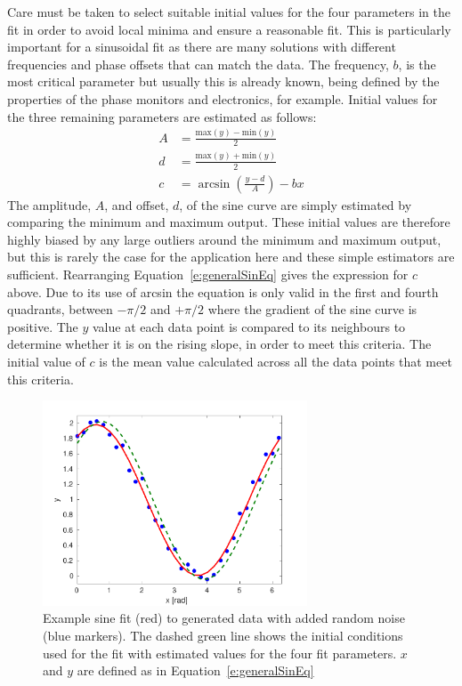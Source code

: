 Care must be taken to select suitable initial values for the four parameters in the fit in order to avoid local minima and ensure a reasonable fit. This is particularly important for a sinusoidal fit as there are many solutions with different frequencies and phase offsets that can match the data. The frequency, \(b\), is the most critical parameter but usually this is already known, being defined by the properties of the phase monitors and electronics, for example. Initial values for the three remaining parameters are estimated as follows:
\begin{align}
A &= \frac{\mathrm{max}(y)-\mathrm{min}(y)}{2} \\
d &= \frac{\mathrm{max}(y)+\mathrm{min}(y)}{2} \\
c &= \arcsin\left(\frac{y-d}{A}\right) - bx
\end{align}
The amplitude, \(A\), and offset, \(d\), of the sine curve are simply estimated by comparing the minimum and maximum output. These initial values are therefore highly biased by any large outliers around the minimum and maximum output, but this is rarely the case for the application here and these simple estimators are sufficient.
Rearranging Equation~\ref{e:generalSinEq} gives the expression for \(c\) above. Due to its use of arcsin the equation is only valid in the first and fourth quadrants, between \(-\pi/2\) and \(+\pi/2\) where the gradient of the sine curve is positive. The \(y\) value at each data point is compared to its neighbours to determine whether it is on the rising slope, in order to meet this criteria. The initial value of \(c\) is the mean value calculated across all the data points that meet this criteria.

\begin{figure}
  \centering
  \includegraphics[width=0.7\textwidth]{Figures/phaseMons/sinFitEx}
  \caption{Example sine fit (red) to generated data with added random noise (blue markers). The dashed green line shows the initial conditions used for the fit with estimated values for the four fit parameters. \(x\) and \(y\) are defined as in Equation~\ref{e:generalSinEq}}
  \label{f:sinFitEx}
\end{figure}

